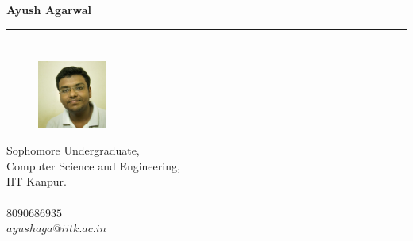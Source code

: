 \documentclass[a4paper]{article}
\author{Ayush Agarwal}
\begin{document}
\begin{center}
 \huge\textbf{Ayush Agarwal}\\
\end{center}
\hrule
\section*{}
\begin{figure} 
    \includegraphics[width=0.20\textwidth]{photo}
\end{figure}
 Sophomore Undergraduate,\\
 Computer Science and Engineering,\\
 IIT Kanpur.\\
 \\
 $8090686935$\\
 $ayushaga@iitk.ac.in$
\end{document}
